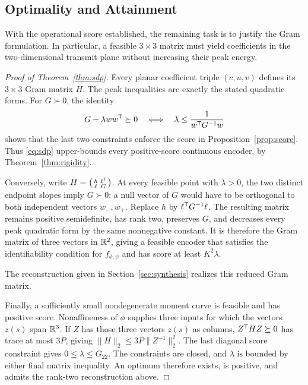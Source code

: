 \subsection{Optimality and Attainment}
With the operational score established, the remaining task is to justify the Gram formulation. In particular, a feasible $3\times3$ matrix must yield coefficients in the two-dimensional transmit plane without increasing their peak energy.
\begin{proof}[Proof of Theorem~\ref{thm:sdp}]
Every planar coefficient triple $(c,u,v)$ defines its $3\times3$ Gram matrix $H$. The peak inequalities are exactly the stated quadratic forms. For $G\succ0$, the identity
$$
 G-\lambda ww^\mathsf T\succeq0
 \quad\Longleftrightarrow\quad
 \lambda\le\frac1{w^\mathsf T G^{-1}w}
$$
shows that the last two constraints enforce the score in Proposition~\ref{prop:score}. Thus \eqref{eq:sdp} upper-bounds every positive-score continuous encoder, by Theorem~\ref{thm:rigidity}.

Conversely, write $H=\left(\begin{smallmatrix}h&\ell^\mathsf T\\\ell&G\end{smallmatrix}\right)$. At every feasible point with $\lambda>0$, the two distinct endpoint slopes imply $G\succ0$: a null vector of $G$ would have to be orthogonal to both independent vectors $w_-,w_+$. Replace $h$ by $\ell^\mathsf T G^{-1}\ell$. The resulting matrix remains positive semidefinite, has rank two, preserves $G$, and decreases every peak quadratic form by the same nonnegative constant. It is therefore the Gram matrix of three vectors in $\mathbb R^2$, giving a feasible encoder that satisfies the identifiability condition for $f_{\phi,\psi}$ and has score at least $K^2\lambda$.

The reconstruction given in Section~\ref{sec:synthesis} realizes this reduced Gram matrix.

Finally, a sufficiently small nondegenerate moment curve is feasible and has positive score. Nonaffineness of $\phi$ supplies three inputs for which the vectors $z(s)$ span $\mathbb R^3$. If $Z$ has those three vectors $z(s)$ as columns, $Z^\mathsf T HZ\succeq0$ has trace at most $3P$, giving $\|H\|_2\le3P\|Z^{-1}\|_2^2$. The last diagonal score constraint gives $0\le\lambda\le G_{22}$. The constraints are closed, and $\lambda$ is bounded by either final matrix inequality. An optimum therefore exists, is positive, and admits the rank-two reconstruction above.
\end{proof}
